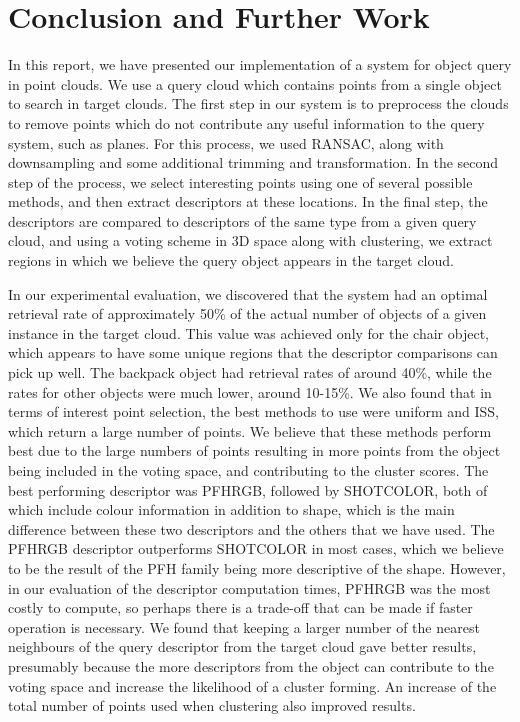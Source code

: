 \documentclass[11pt,a4paper]{kth-mag}
\begin{document}
\chapter{Conclusion and Further Work}
\label{chap:conc}
In this report, we have presented our implementation of a system for object
query in point clouds. We use a query cloud which contains points from a single
object to search in target clouds. The first step in our system is to preprocess
the clouds to remove points which do not contribute any useful information to
the query system, such as planes. For this process, we used RANSAC, along with
downsampling and some additional trimming and transformation. In the second step
of the process, we select interesting points using one of several possible
methods, and then extract descriptors at these locations. In the final step, the
descriptors are compared to descriptors of the same type from a given query
cloud, and using a voting scheme in 3D space along with clustering, we extract
regions in which we believe the query object appears in the target cloud.

In our experimental evaluation, we discovered that the system had an optimal
retrieval rate of approximately 50\% of the actual number of objects of a given
instance in the target cloud. This value was achieved only for the chair object,
which appears to have some unique regions that the descriptor comparisons can
pick up well. The backpack object had retrieval rates of around 40\%, while the
rates for other objects were much lower, around 10-15\%. We also found that in
terms of interest point selection, the best methods to use were uniform and ISS,
which return a large number of points. We believe that these methods perform
best due to the large numbers of points resulting in more points from the object
being included in the voting space, and contributing to the cluster scores. The
best performing descriptor was PFHRGB, followed by SHOTCOLOR, both of which
include colour information in addition to shape, which is the main difference
between these two descriptors and the others that we have used. The PFHRGB
descriptor outperforms SHOTCOLOR in most cases, which we believe to be the
result of the PFH family being more descriptive of the shape. However, in our
evaluation of the descriptor computation times, PFHRGB was the most costly to
compute, so perhaps there is a trade-off that can be made if faster operation is
necessary. We found that keeping a larger number of the nearest neighbours of
the query descriptor from the target cloud gave better results, presumably
because the more descriptors from the object can contribute to the voting space
and increase the likelihood of a cluster forming. An increase of the total
number of points used when clustering also improved results.
\end{document}
